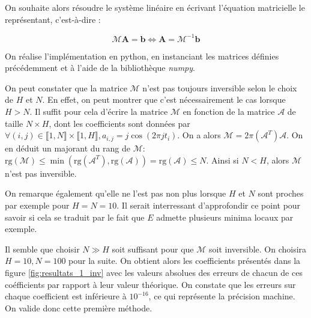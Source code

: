 \documentclass[12pt]{report}
\begin{document}
On souhaite alors résoudre le système linéaire en écrivant l'équation matricielle le représentant, c'est-à-dire :

\begin{equation}
    \mathcal{M} \bm{A} = \bm{b} \Leftrightarrow \bm{A} = \mathcal{M}^{-1}\bm{b}
    \label{eq:equation_matricielle}
\end{equation}

On réalise l'implémentation en python, en instanciant les matrices définies précédemment et à l'aide de la bibliothèque \emph{numpy}.

On peut constater que la matrice $\mathcal{M}$ n'est pas toujours inversible selon le choix de $H$ et $N$.
En effet, on peut montrer que c'est nécessairement le cas lorsque $H>N$. Il suffit pour cela d'écrire la matrice $\mathcal{M}$ en fonction de la matrice $\mathcal{A}$ de taille $N \times H$, dont les coefficients sont données par $ \forall (i,j) \in \llbracket 1, N\rrbracket \times \llbracket 1, H\rrbracket, a_{i,j} = j \cos(2 \pi j t_i)$.
On a alors $\mathcal{M} = 2\pi(\mathcal{A}^T)\mathcal{A}$. On en déduit un majorant du rang de $\mathcal{M}$: $\mathrm{rg}(\mathcal{M}) \leq \min(\mathrm{rg}(\mathcal{A}^T), \mathrm{rg}(\mathcal{A})) = \mathrm{rg}(\mathcal{A}) \leq N $. Ainsi si $N<H$, alors $\mathcal{M}$ n'est pas inversible.

On remarque également qu'elle ne l'est pas non plus lorsque $H$ et $N$ sont proches par exemple pour $H=N=10$.
Il serait interressant d'approfondir ce point pour savoir si cela se traduit par le fait que $E$ admette plusieurs minima locaux par exemple.

Il semble que choisir $N\gg H$ soit suffisant pour que $\mathcal{M}$ soit inversible.
On choisira $H=10, N=100$ pour la suite.
On obtient alors les coefficients présentés dans la figure \ref{fig:resultats_1_inv} avec les valeurs absolues des erreurs de chacun de ces coéfficients par rapport à leur valeur théorique.
On constate que les erreurs sur chaque coefficient est inférieure à $10^{-16}$, ce qui représente la précision machine.
On valide donc cette première méthode.
\end{document}
